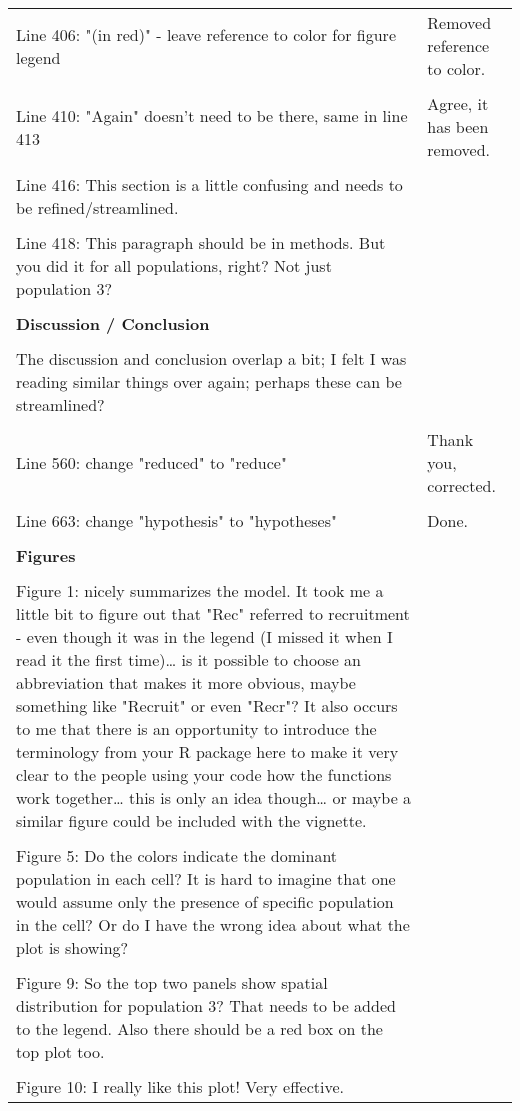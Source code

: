 \documentclass{article}
\begin{document}
\begin{landscape}
\begin{center}
\begin{longtable}{p{12cm} | p{12cm}}
\\
Line 406: "(in red)" - leave reference to color for figure legend & Removed
reference to color. \\
\\
Line 410: "Again" doesn't need to be there, same in line 413 & Agree, it has
been removed. \\
\\
Line 416: This section is a little confusing and needs to be refined/streamlined. & \\
\\
Line 418: This paragraph should be in methods. But you did it for all
populations, right? Not just population 3? & \\
\\
		\hline
		\textbf{Discussion / Conclusion} &  \\
\\
The discussion and conclusion overlap a bit; I felt I was reading similar
things over again; perhaps these can be streamlined? & \\
\\
Line 560: change "reduced" to "reduce" & Thank you, corrected. \\
\\
Line 663: change "hypothesis" to "hypotheses" & Done. \\
\\
		\hline
		\textbf{Figures} &  \\
\\
Figure 1: nicely summarizes the model. It took me a little bit to figure out
that "Rec" referred to recruitment - even though it was in the legend (I missed
it when I read it the first time)… is it possible to choose an abbreviation
that makes it more obvious, maybe something like "Recruit" or  even "Recr"? It
also occurs to me that there is an opportunity to introduce the terminology
from your R package here to make it very clear to the people using your code
how the functions work together… this is only an idea though… or maybe a
similar figure could be included with the vignette. & \\
\\
Figure 5: Do the colors indicate the dominant population in each cell? It is
hard to imagine that one would assume only the presence of specific population
in the cell? Or do I have the wrong idea about what the plot is showing? & \\
\\
Figure 9: So the top two panels show spatial distribution for population 3?
That needs to be added to the legend. Also there should be a red box on the top
plot too. & \\
\\
Figure 10: I really like this plot! Very effective. & \\
		\bottomrule
	\end{longtable}


\end{center}
\end{landscape}
\end{document}
